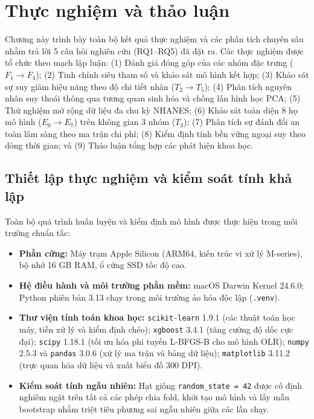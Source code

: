 \chapter{Thực nghiệm và thảo luận}
\label{ch:thuc-nghiem}

Chương này trình bày toàn bộ kết quả thực nghiệm và các phân tích chuyên sâu nhằm trả lời 5 câu hỏi nghiên cứu (RQ1--RQ5) đã đặt ra. Các thực nghiệm được tổ chức theo mạch lập luận: (1) Đánh giá đóng góp của các nhóm đặc trưng ($F_1 \to F_4$); (2) Tinh chỉnh siêu tham số và khảo sát mô hình kết hợp; (3) Khảo sát sự suy giảm hiệu năng theo độ chi tiết nhãn ($T_2 \to T_5$); (4) Phân tích nguyên nhân suy thoái thông qua tương quan sinh hóa và chồng lấn hình học PCA; (5) Thử nghiệm mở rộng dữ liệu đa chu kỳ NHANES; (6) Khảo sát toàn diện 8 họ mô hình ($E_0 \to E_7$) trên không gian 3 nhóm ($T_3$); (7) Phân tích sự đánh đổi an toàn lâm sàng theo ma trận chi phí; (8) Kiểm định tính bền vững ngoại suy theo dòng thời gian; và (9) Thảo luận tổng hợp các phát hiện khoa học.

\section{Thiết lập thực nghiệm và kiểm soát tính khả lập}
\label{sec:moi-truong-thuc-nghiem}

Toàn bộ quá trình huấn luyện và kiểm định mô hình được thực hiện trong môi trường chuẩn tắc:
\begin{itemize}
    \item \textbf{Phần cứng:} Máy trạm Apple Silicon (ARM64, kiến trúc vi xử lý M-series), bộ nhớ 16 GB RAM, ổ cứng SSD tốc độ cao.
    \item \textbf{Hệ điều hành và môi trường phần mềm:} macOS Darwin Kernel 24.6.0; Python phiên bản 3.13 chạy trong môi trường ảo hóa độc lập (\texttt{.venv}).
    \item \textbf{Thư viện tính toán khoa học:} \texttt{scikit-learn} 1.9.1 (các thuật toán học máy, tiền xử lý và kiểm định chéo); \texttt{xgboost} 3.4.1 (tăng cường độ dốc cực đại); \texttt{scipy} 1.18.1 (tối ưu hóa phi tuyến L-BFGS-B cho mô hình OLR); \texttt{numpy} 2.5.3 và \texttt{pandas} 3.0.6 (xử lý ma trận và bảng dữ liệu); \texttt{matplotlib} 3.11.2 (trực quan hóa dữ liệu và xuất biểu đồ 300 DPI).
    \item \textbf{Kiểm soát tính ngẫu nhiên:} Hạt giống \texttt{random\_state = 42} được cố định nghiêm ngặt trên tất cả các phép chia fold, khởi tạo mô hình và lấy mẫu bootstrap nhằm triệt tiêu phương sai ngẫu nhiên giữa các lần chạy.
\end{itemize}

